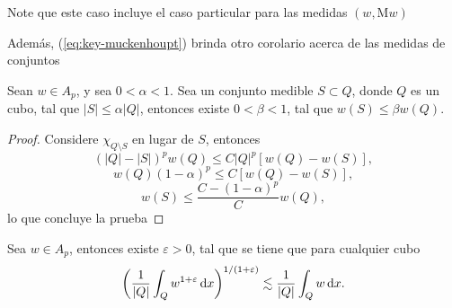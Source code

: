 \begin{remark}
	Note que este caso incluye el caso particular para las medidas $(w,\mathrm{M}w)$
\end{remark}
Además, (\ref{eq:key-muckenhoupt}) brinda otro corolario acerca de las medidas de conjuntos
\begin{corollary}
	Sean $w\in A_p$, y sea $0<\alpha<1$. Sea un conjunto medible $S\subset Q$, donde $Q$ es un cubo, tal que $|S|\leq \alpha|Q|$, entonces existe $0<\beta<1$, tal que $w(S)\leq \beta w(Q)$.
\end{corollary}
\begin{proof}
	Considere $\chi_{Q\setminus S}$ en lugar de $S$, entonces
	\begin{equation*}
		(|Q|-|S|)^p w(Q) \leq C |Q|^p [w(Q) - w(S)],
	\end{equation*}
	\begin{equation*}
		w(Q)(1-\alpha)^p \leq C [w(Q) - w(S)],
	\end{equation*}
	\begin{equation*}
		w(S) \leq \frac{C-(1-\alpha)^p}{C}w(Q), 
	\end{equation*}
	lo que concluye la prueba
\end{proof}
\begin{theorem}
	Sea $w\in A_p$, entonces existe $\varepsilon>0$, tal que se tiene que para cualquier cubo 
	\begin{equation*}
		\left(\frac{1}{|Q|}\int_Q w^{1+\varepsilon}\mathop{}\!\mathrm{d} x \right)^{1/(1+\varepsilon)} \lesssim \frac{1}{|Q|} \int_Q w\mathop{}\!\mathrm{d} x.
	\end{equation*}
\end{theorem}
